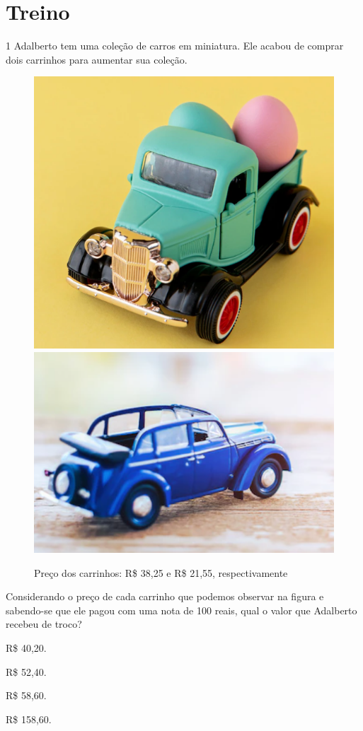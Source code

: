 
\section*{Treino}

\num{1} Adalberto tem uma coleção de carros em miniatura. Ele acabou de
comprar dois carrinhos para aumentar sua coleção.

\begin{figure}[htpb!]
\includegraphics[width=.5\textwidth]{./imgs/mat17a.png}
\includegraphics[width=.5\textwidth]{./imgs/mat17b.png}
\caption{Preço dos carrinhos: R\$ 38,25 e R\$ 21,55, respectivamente}
\end{figure}

Considerando o preço de cada carrinho que podemos observar na figura e sabendo-se que ele pagou com uma nota de 100 reais, qual o valor
que Adalberto recebeu de troco?

\begin{escolha}
\item
  R\$ 40,20.
\item
  R\$ 52,40.
\item
  R\$ 58,60.
\item
  R\$ 158,60.
\end{escolha}


